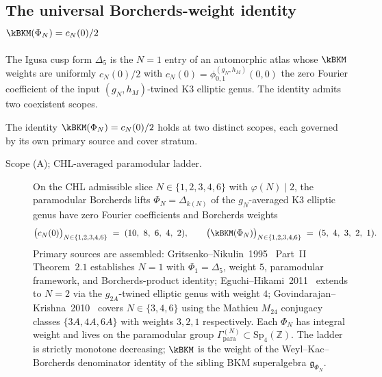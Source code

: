 \subsection{The universal Borcherds-weight identity \texorpdfstring{$\kBKM(\Phi_N) = c_N(0)/2$}{kBKM(Phi-N) = c-N(0)/2}}
\label{subsec:k3e-universal-kBKM-identity}

The Igusa cusp form $\Delta_5$ is the $N = 1$ entry of an automorphic atlas whose $\kBKM$ weights are uniformly $c_N(0)/2$ with $c_N(0) = \phi_{0,1}^{(g_N, h_M)}(0, 0)$ the zero Fourier coefficient of the input $(g_N, h_M)$-twined K3 elliptic genus. The identity admits two coexistent scopes.

\begin{theorem}
\label{thm:k3e-universal-kBKM-two-scopes}
The identity $\kBKM(\Phi_N) = c_N(0)/2$ holds at two distinct scopes, each governed by its own primary source and cover stratum.
\begin{description}
\item[Scope (A); CHL-averaged paramodular ladder.]
On the CHL admissible slice $N \in \{1, 2, 3, 4, 6\}$ with $\varphi(N) \mid 2$, the paramodular Borcherds lifts $\Phi_N = \Delta_{k(N)}$ of the $g_N$-averaged K3 elliptic genus have zero Fourier coefficients and Borcherds weights
\[
 \bigl(c_N(0)\bigr)_{N \in \{1,2,3,4,6\}} \;=\; (10,\ 8,\ 6,\ 4,\ 2), \qquad
 \bigl(\kBKM(\Phi_N)\bigr)_{N \in \{1,2,3,4,6\}} \;=\; (5,\ 4,\ 3,\ 2,\ 1).
\]
Primary sources are assembled: Gritsenko--Nikulin~1995~\cite{GritsenkoNikulin1995} Part~II Theorem~$2.1$ establishes $N = 1$ with $\Phi_1 = \Delta_5$, weight $5$, paramodular framework, and Borcherds-product identity; Eguchi--Hikami~2011~\cite{EguchiHikami2011} extends to $N = 2$ via the $g_{2A}$-twined elliptic genus with weight $4$; Govindarajan--Krishna~2010~\cite{GovindarajanKrishna2010} covers $N \in \{3, 4, 6\}$ using the Mathieu $M_{24}$ conjugacy classes $\{3A, 4A, 6A\}$ with weights $3, 2, 1$ respectively. Each $\Phi_N$ has integral weight and lives on the paramodular group $\Gamma_{\mathrm{para}}^{(N)} \subset \mathrm{Sp}_4(\mathbb{Z})$. The ladder is strictly monotone decreasing; $\kBKM$ is the weight of the Weyl--Kac--Borcherds denominator identity of the sibling BKM superalgebra $\mathfrak{g}_{\Phi_N}$.


\end{description}
\end{theorem}
